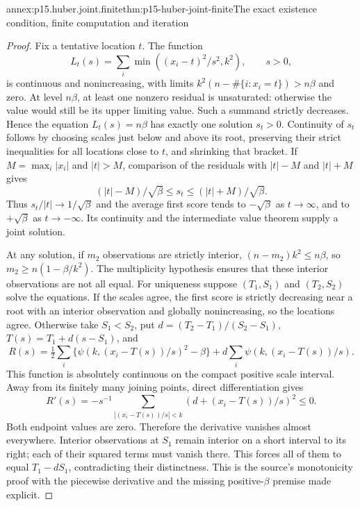 \begin{annexitem}{annex:p15.huber.joint.finite}{thm:p15-huber-joint-finite}{The exact existence condition, finite computation and iteration}
\begin{proof}
Fix a tentative location \(t\). The function
\[
 L_t(s)=\sum_i\min((x_i-t)^2/s^2,k^2),\qquad s>0,
\]
is continuous and nonincreasing, with limits
\(k^2(n-\#\{i:x_i=t\})>n\beta\) and zero.
At level \(n\beta\), at least one nonzero residual is unsaturated:
otherwise the value would still be its upper limiting value.
Such a summand strictly decreases. Hence the equation
\(L_t(s)=n\beta\) has exactly one solution \(s_t>0\).
Continuity of \(s_t\) follows by choosing scales just below and
above its root, preserving their strict inequalities for all
locations close to \(t\), and shrinking that bracket.
If \(M=\max_i|x_i|\) and \(|t|>M\), comparison of the residuals
with \(|t|-M\) and \(|t|+M\) gives
\[
 (|t|-M)/\sqrt\beta\leq s_t\leq(|t|+M)/\sqrt\beta .
\]
Thus \(s_t/|t|\to1/\sqrt\beta\) and the average first score tends
to \(-\sqrt\beta\) as \(t\to\infty\), and to \(+\sqrt\beta\)
as \(t\to-\infty\). Its continuity and the intermediate value
theorem supply a joint solution.

At any solution, if \(m_2\) observations are strictly interior,
\((n-m_2)k^2\leq n\beta\), so
\(m_2\geq n(1-\beta/k^2)\). The multiplicity hypothesis ensures
that these interior observations are not all equal.
For uniqueness suppose \((T_1,S_1)\) and \((T_2,S_2)\) solve
the equations. If the scales agree, the first score is strictly
decreasing near a root with an interior observation and globally
nonincreasing, so the locations agree.
Otherwise take \(S_1<S_2\), put
\(d=(T_2-T_1)/(S_2-S_1)\), \(T(s)=T_1+d(s-S_1)\), and
\[
 R(s)=\tfrac12\sum_i\{\psi(k,(x_i-T(s))/s)^2-\beta\}
               +d\sum_i\psi(k,(x_i-T(s))/s).
\]
This function is absolutely continuous on the compact positive
scale interval. Away from its finitely many joining points,
direct differentiation gives
\[
 R'(s)=-s^{-1}\sum_{|(x_i-T(s))/s|<k}
                       (d+(x_i-T(s))/s)^2\leq0.
\]
Both endpoint values are zero. Therefore the derivative vanishes
almost everywhere. Interior observations at \(S_1\) remain interior
on a short interval to its right; each of their squared terms
must vanish there. This forces all of them to equal
\(T_1-dS_1\), contradicting their distinctness.
This is the source's monotonicity proof with the piecewise derivative
and the missing positive-\(\beta\) premise made explicit.


\end{proof}
\end{annexitem}
